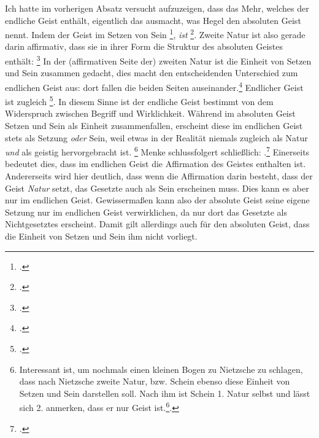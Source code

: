 \documentclass[12pt, a4paper, openany]{report}
\begin{document}
Ich hatte im vorherigen Absatz versucht aufzuzeigen, dass das Mehr, welches der endliche Geist enthält, eigentlich das ausmacht, was Hegel den absoluten Geist nennt.
Indem der Geist im Setzen von Sein \footcite[][§ 384, S. 29]{hegel_enzyklopädie_1969}, \emph{ist} \footcite[][144]{menke_autonomie_2018}.
Zweite Natur ist also gerade darin affirmativ, dass sie in ihrer Form die Struktur des absoluten Geistes enthält: 
\footcite[][§ 385 Z, S. 34]{hegel_enzyklopädie_1969}
In der (affirmativen Seite der) zweiten Natur ist die Einheit von Setzen und Sein zusammen gedacht, dies macht den entscheidenden Unterschied zum endlichen Geist aus: 
dort fallen die beiden Seiten auseinander.\footcite[Vgl.][S. 143 - S. 144]{menke_autonomie_2018}
Endlicher Geist ist zugleich \footcite[][144]{menke_autonomie_2018}.
In diesem Sinne ist der endliche Geist bestimmt von dem Widerspruch zwischen Begriff und Wirklichkeit. 
Während im absoluten Geist Setzen und Sein als Einheit zusammenfallen, erscheint diese im endlichen Geist stets als Setzung \emph{oder} Sein, weil etwas in der Realität niemals zugleich als Natur \emph{und} als geistig hervorgebracht ist.%
\footnote{
    Interessant ist, um nochmals einen kleinen Bogen zu Nietzsche zu schlagen, dass nach Nietzsche zweite Natur, bzw. Schein ebenso diese Einheit von Setzen und Sein darstellen soll.
    Nach ihm ist Schein 1. Natur selbst und lässt sich 2. anmerken, dass er nur Geist ist.\footcite[Vgl.][S. 417]{nietzsche_morgenrote_1999}. 
}
Menke schlussfolgert schließlich: 
.\footcite[][144]{menke_autonomie_2018}
Einerseits bedeutet dies, dass im endlichen Geist die Affirmation des Geistes enthalten ist.
Andererseits wird hier deutlich, dass wenn die Affirmation darin besteht, dass der Geist \emph{Natur} setzt, das Gesetzte auch als Sein erscheinen muss.
Dies kann es aber nur im endlichen Geist.
Gewissermaßen kann also der absolute Geist seine eigene Setzung nur im endlichen Geist verwirklichen, da nur dort das Gesetzte als Nichtgesetztes erscheint.
Damit gilt allerdings auch für den absoluten Geist, dass die Einheit von Setzen und Sein ihm nicht vorliegt.
\end{document}
